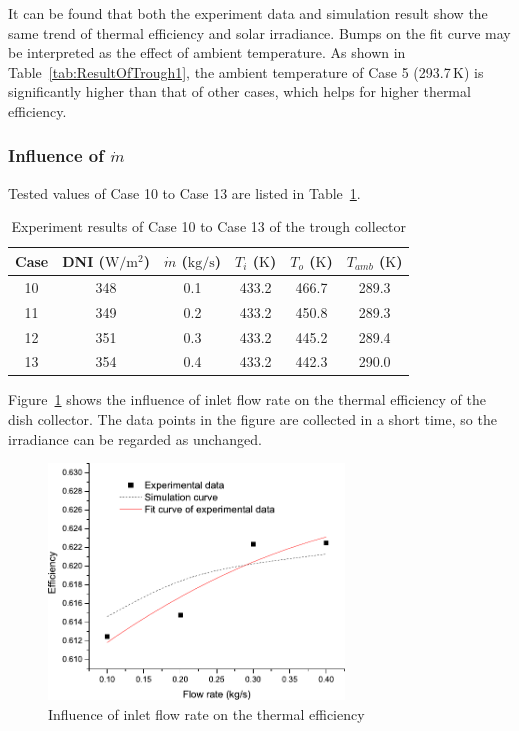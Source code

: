 It can be found that both the experiment data and simulation result show the same trend of thermal efficiency and solar irradiance. Bumps on the fit curve may be interpreted as the effect of ambient temperature. As shown in Table~\ref{tab:ResultOfTrough1}, the ambient temperature of Case 5 (293.7$\,\mathrm{K}$) is significantly higher than that of other cases, which helps for higher thermal efficiency.

\subsubsection{Influence of $\dot{m}$}
Tested values of Case 10 to Case 13 are listed in Table~\ref{tab:ResultOfTrough2}.

\begin{table}[htbp]\footnotesize
	\caption{Experiment results of Case 10 to Case 13 of the trough collector}
	\begin{center}
	\begin{tabular}{cccccc}
		\toprule
		Case	& DNI ($\mathrm{W/m^2}$)	&	$\dot{m}$ ($\mathrm{kg/s}$)			&	$T_i$ ($\mathrm{K}$)	&	$T_o$ ($\mathrm{K}$)		&	$T_{amb}$ ($\mathrm{K}$)\\
		\midrule
		10	&	348	&	0.1	&	433.2	&	466.7	&	289.3\\
		11	&	349	&	0.2	&	433.2	&	450.8	&	289.3\\
		12	&	351	&	0.3	&	433.2	&	445.2	&	289.4	\\
		13	&	354	&	0.4	&	433.2	&	442.3	&	290.0\\
		\bottomrule
	\end{tabular}
	\end{center}
	\label{tab:ResultOfTrough2}
\end{table}

Figure~\ref{fig:q_m-eta-trough} shows the influence of inlet flow rate on the thermal efficiency of the dish collector. The data points in the figure are collected in a short time, so the irradiance can be regarded as unchanged.
\begin{figure}[!ht]
\centering
\includegraphics[width=0.7\textwidth]{fig/q_m-eta-trough}
\caption{Influence of inlet flow rate on the thermal efficiency}
\label{fig:q_m-eta-trough}
\end{figure}

